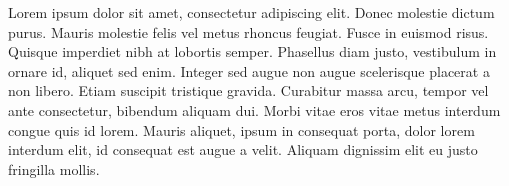 Lorem ipsum dolor sit amet, consectetur adipiscing elit. Donec molestie dictum purus. Mauris molestie felis vel metus rhoncus feugiat. Fusce in euismod risus. Quisque imperdiet nibh at lobortis semper. Phasellus diam justo, vestibulum in ornare id, aliquet sed enim. Integer sed augue non augue scelerisque placerat a non libero. Etiam suscipit tristique gravida. Curabitur massa arcu, tempor vel ante consectetur, bibendum aliquam dui. Morbi vitae eros vitae metus interdum congue quis id lorem. Mauris aliquet, ipsum in consequat porta, dolor lorem interdum elit, id consequat est augue a velit. Aliquam dignissim elit eu justo fringilla mollis.